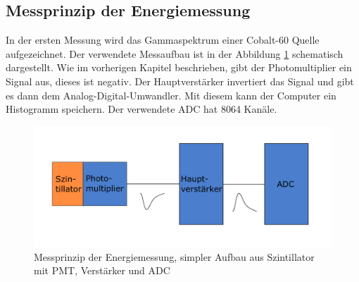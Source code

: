 \documentclass[12pt,a4paper,ngerman]{report}
\begin{document}
	\subsection{Messprinzip der Energiemessung}\label{ch:EnergieMessung}
	In der ersten Messung wird das Gammaspektrum einer Cobalt-60 Quelle aufgezeichnet. Der verwendete Messaufbau ist in der Abbildung \ref{img:EnergieAufbau} schematisch dargestellt. Wie im vorherigen Kapitel beschrieben, gibt der Photomultiplier ein Signal aus, dieses ist negativ. Der Hauptverstärker invertiert das Signal und gibt es dann dem Analog-Digital-Umwandler. Mit diesem kann der Computer ein Histogramm speichern. Der verwendete ADC hat 8064 Kanäle.
	\begin{figure}[ht]
		\centering
		\includegraphics[width=\textwidth]{Bilder/Energiemessung.pdf}		
		\caption[Messprinzip Energiemessung]{Messprinzip der Energiemessung, simpler Aufbau aus Szintillator mit PMT, Verstärker und ADC}
		\label{img:EnergieAufbau}
	\end{figure}
\end{document}
